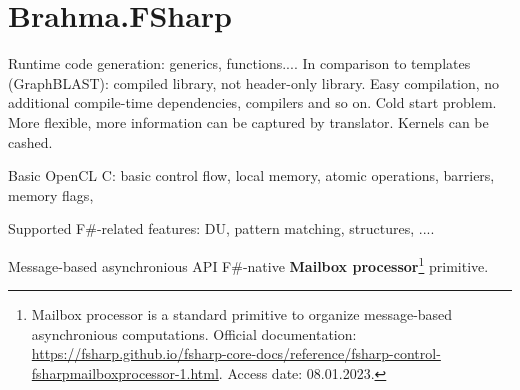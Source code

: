 \section{Brahma.FSharp}

Runtime code generation: generics, functions.... 
In comparison to templates (GraphBLAST): compiled library, not header-only library. 
Easy compilation, no additional compile-time dependencies, compilers and so on. 
Cold start problem. 
More flexible, more information can be captured by translator.
Kernels can be cashed. 

Basic OpenCL C: basic control flow, local memory, atomic operations, barriers, memory flags,

Supported F\#-related features: DU, pattern matching, structures, ....

Message-based asynchronious API F\#-native \textbf{Mailbox processor}\footnote{Mailbox processor is a standard primitive to organize message-based asynchronious computations. Official documentation: \url{https://fsharp.github.io/fsharp-core-docs/reference/fsharp-control-fsharpmailboxprocessor-1.html}. Access date: 08.01.2023.} primitive.

